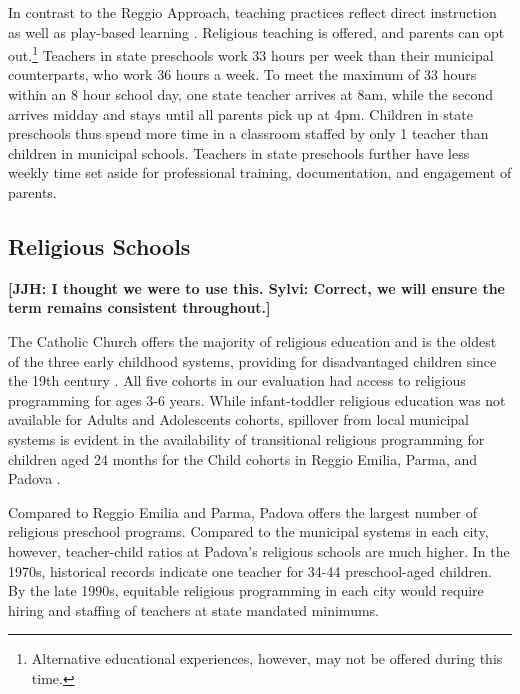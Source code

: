 In contrast to the Reggio Approach, teaching practices reflect direct instruction as well as play-based learning \citep{CEHD_2016_Historical-Analysis}. Religious teaching is offered, and parents can opt out.\footnote{Alternative educational experiences, however, may not be offered during this time.} Teachers in state preschools work 33 hours per week than their municipal counterparts, who work 36 hours a week. To meet the maximum of 33 hours within an 8 hour school day, one state teacher arrives at 8am, while the second arrives midday and stays until all parents pick up at 4pm. Children in state preschools thus spend more time in a classroom staffed by only 1 teacher than children in municipal schools. Teachers in state preschools further have less weekly time set aside for professional training, documentation, and engagement of parents.

\subsection{Religious Schools}

\textbf{[JJH: I thought we were to use this. Sylvi: Correct, we will ensure the term remains consistent throughout.]}

The Catholic Church offers the majority of religious education and is the oldest of the three early childhood systems, providing for disadvantaged children since the 19th century \citep{OECD_2001_Italy-Country-Note}. All five cohorts in our evaluation had access to religious programming for ages 3-6 years. While infant-toddler religious education was not available for Adults and Adolescents cohorts, spillover from local municipal systems is evident in the availability of transitional religious programming for children aged 24 months for the Child cohorts in Reggio Emilia, Parma, and Padova \citep{Malizia-Cicatelli_2011_BOOK_Catholic-School}. 

Compared to Reggio Emilia and Parma, Padova offers the largest number of religious preschool programs. Compared to the municipal systems in each city, however, teacher-child ratios at Padova's religious schools are much higher. In the 1970s, historical records indicate one teacher for 34-44 preschool-aged children. By the late 1990s, equitable religious programming in each city would require hiring and staffing of teachers at state mandated minimums.

